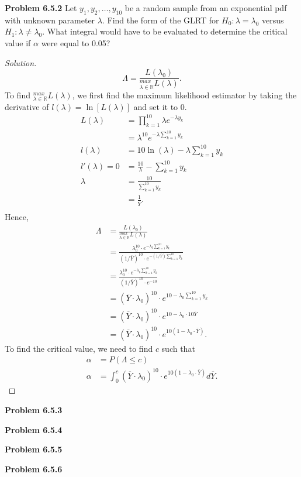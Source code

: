 \documentclass{article}
\begin{document}
\textbf{Problem 6.5.2}
Let $y_1, y_2, \dots, y_{10}$ be a random sample from an exponential pdf with unknown parameter $\lambda$. 
Find the form of the GLRT for $H_0: \lambda = \lambda_0$ versus $H_1: \lambda \neq \lambda_0$. 
What integral would have to be evaluated to determine the critical value if $\alpha$ were equal to 0.05?
\begin{proof}[Solution]
    $$\Lambda = \frac{L(\lambda_0)}{^{max}_{\lambda\in\mathbb{R}}L(\lambda)}.$$
    To find $^{max}_{\lambda\in\mathbb{R}}L(\lambda)$, we first find 
    the maximum likelihood estimator by taking the derivative of $l(\lambda) = \ln[L(\lambda)]$ and set it to 0.
    \begin{align*}
        L(\lambda) & = \prod_{k=1}^{10}\lambda e^{-\lambda y_k} \\
        & = \lambda^{10}e^{-\lambda\sum_{k=1}^{10}y_k} \\
        l(\lambda) & = 10\ln(\lambda) - \lambda\sum_{k=1}^{10}y_k \\
        l'(\lambda) = 0 & = \frac{10}{\lambda} - \sum_{k=1}^{10}y_k \\
        \lambda & = \frac{10}{\sum_{k=1}^{10}y_k} \\
        & = \frac{1}{\overline{Y}}. \\
    \end{align*}
    Hence,
    \begin{align*}
        \Lambda & = \frac{L(\lambda_0)}{^{max}_{\lambda\in\mathbb{R}}L(\lambda)} \\
        & = \frac{\lambda_0^{10}\cdot e^{-\lambda_0\sum_{k=1}^{10}y_k}}{(1/\overline{Y})^{10}\cdot e^{-(1/\overline{Y})\sum_{k=1}^{10}y_k}} \\
        & = \frac{\lambda_0^{10}\cdot e^{-\lambda_0\sum_{k=1}^{10}y_k}}{(1/\overline{Y})^{10}\cdot e^{-10}} \\
        & = (\overline{Y}\cdot \lambda_0)^{10}\cdot e^{10 -\lambda_0\sum_{k=1}^{10}y_k} \\
        & = (\overline{Y}\cdot \lambda_0)^{10}\cdot e^{10 -\lambda_0\cdot 10\overline{Y}} \\
        & = (\overline{Y}\cdot \lambda_0)^{10}\cdot e^{10(1 -\lambda_0\cdot \overline{Y})}.
    \end{align*}
    To find the critical value, we need to find $c$ such that
    \begin{align*}
        \alpha & = P(\Lambda \leq c) \\
        \alpha & = \int_{0}^{c} (\overline{Y}\cdot \lambda_0)^{10}\cdot e^{10(1 -\lambda_0\cdot \overline{Y})} d\overline{Y}.
    \end{align*}
\end{proof}
\bigbreak


\textbf{Problem 6.5.3}

\bigbreak


\textbf{Problem 6.5.4}

\bigbreak


\textbf{Problem 6.5.5}

\bigbreak


\textbf{Problem 6.5.6}
\end{document}
